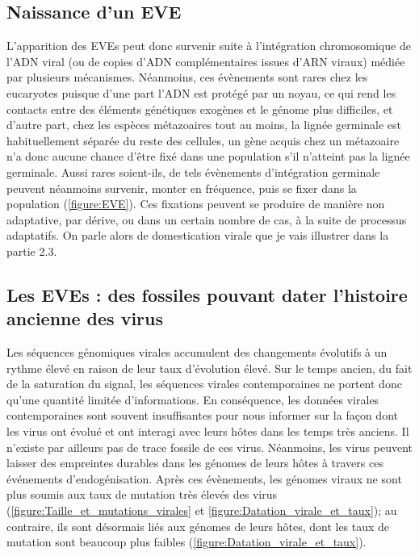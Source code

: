 \subsection{Naissance d'un EVE}

L'apparition des EVEs peut donc survenir suite à l'intégration chromosomique de l'ADN viral (ou de copies d'ADN complémentaires issues d'ARN viraux) médiée par plusieurs mécanismes. Néanmoins, ces évènements sont rares chez les eucaryotes puisque d’une part l’ADN est protégé par un noyau, ce qui rend les contacts entre des éléments génétiques exogènes et le génome plus difficiles, et d’autre part, chez les espèces métazoaires tout au moins, la lignée germinale est habituellement séparée du reste des cellules, un gène acquis chez un métazoaire n’a donc aucune chance d'être fixé dans une population s’il n’atteint pas la lignée germinale. Aussi rares soient-ils, de tels évènements d'intégration germinale peuvent néanmoins survenir, monter en fréquence, puis se fixer dans la population  (\figurename{\ref{figure:EVE}}). Ces fixations peuvent se produire de manière non adaptative, par dérive, ou dans un certain nombre de cas, à la suite de processus adaptatifs. On parle alors de domestication virale que je vais illustrer dans la partie 2.3. 

\subsection{Les EVEs : des fossiles pouvant dater l'histoire ancienne des virus} 

Les séquences génomiques virales accumulent des changements évolutifs à un rythme élevé en raison de leur taux d'évolution élevé. Sur le temps ancien, du fait de la saturation du signal, les séquences virales contemporaines ne portent donc qu'une quantité limitée d'informations. En conséquence, les données virales contemporaines sont souvent insuffisantes pour nous informer sur la façon dont les virus ont évolué et ont interagi avec leurs hôtes dans les temps très anciens. Il n'existe par ailleurs pas de trace fossile de ces virus. Néanmoins, les virus peuvent laisser des empreintes durables dans les génomes de leurs hôtes à travers ces événements d'endogénisation. Après ces évènements, les génomes viraux ne sont plus soumis aux taux de mutation très élevés des virus (\figurename{\ref{figure:Taille_et_mutations_virales}} et \figurename{\ref{figure:Datation_virale_et_taux}}); au contraire, ils sont désormais liés aux génomes de leurs hôtes, dont les taux de mutation sont beaucoup plus faibles \citep{katzourakis_endogenous_2010, feschotte_endogenous_2012} (\figurename{\ref{figure:Datation_virale_et_taux}}). 

